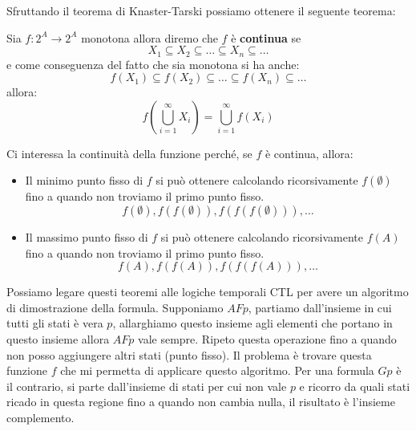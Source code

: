 Sfruttando il teorema di Knaster-Tarski possiamo ottenere il seguente teorema:
\begin{teorema}
    Sia $f:2^A \to 2^A$ monotona allora diremo che $f$ è \textbf{continua} se
    \begin{equation}
        X_1 \subseteq X_2 \subseteq \dots \subseteq X_n \subseteq \dots
    \end{equation}
    e come conseguenza del fatto che sia monotona si ha anche:
    \begin{equation}
        f(X_1) \subseteq f(X_2) \subseteq \dots \subseteq f(X_n) \subseteq \dots
    \end{equation}
    allora:
    \begin{equation}
        f(\bigcup_{i=1}^{\infty} X_i) = \bigcup_{i=1}^{\infty} f(X_i)
    \end{equation}
\end{teorema}
Ci interessa la continuità della funzione perché, se $f$ è continua, allora:
\begin{itemize}
    \item Il minimo punto fisso di $f$ si può ottenere calcolando ricorsivamente
          $f(\emptyset)$ fino a quando non troviamo il primo punto fisso.
          \begin{equation}
              f(\emptyset), f(f(\emptyset)), f(f(f(\emptyset))), \dots
          \end{equation}
    \item Il massimo punto fisso di $f$ si può ottenere calcolando ricorsivamente
          $f(A)$ fino a quando non troviamo il primo punto fisso.
          \begin{equation}
              f(A), f(f(A)), f(f(f(A))), \dots
          \end{equation}
\end{itemize}
Possiamo legare questi teoremi alle logiche temporali CTL per avere un algoritmo
di dimostrazione della formula. Supponiamo $AFp$, partiamo dall'insieme in cui
tutti gli stati è vera $p$, allarghiamo questo insieme agli elementi che portano in
questo insieme allora $AFp$ vale sempre. Ripeto questa operazione fino a quando
non posso aggiungere altri stati (punto fisso). Il problema è trovare questa
funzione $f$ che mi permetta di applicare questo algoritmo. Per una formula $Gp$
è il contrario, si parte dall'insieme di stati per cui non vale $p$ e ricorro da
quali stati ricado in questa regione fino a quando non cambia nulla, il risultato
è l'insieme complemento.
